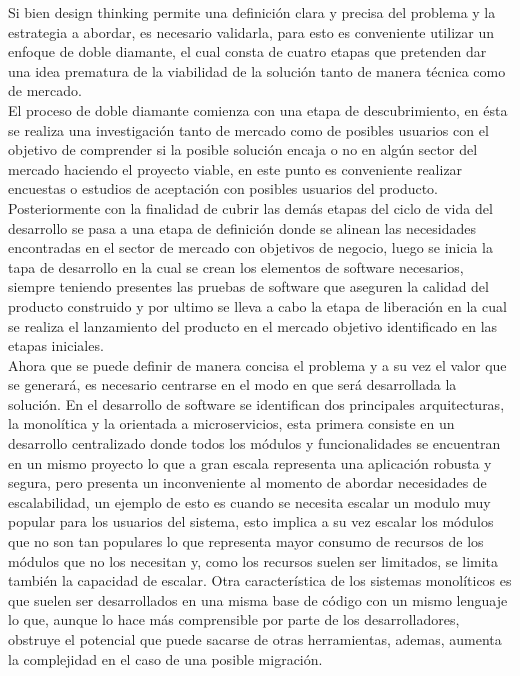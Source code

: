 Si bien design thinking permite una definición clara y precisa del problema y la estrategia a abordar, es necesario validarla, para esto es conveniente utilizar un enfoque de doble diamante, el cual consta de  cuatro etapas que pretenden dar una idea prematura de la viabilidad de la solución tanto de manera técnica como de mercado.\\

El proceso de doble diamante comienza con una etapa de descubrimiento, en ésta se realiza una investigación tanto de mercado como de posibles usuarios con el objetivo de comprender si la posible solución encaja o no en algún sector del mercado haciendo el proyecto viable, en este punto es conveniente realizar encuestas o estudios de aceptación con posibles usuarios del producto. Posteriormente con la finalidad de cubrir las demás etapas del ciclo de vida del desarrollo  se pasa a una etapa de definición donde se alinean las necesidades encontradas en el sector de mercado con objetivos de negocio, luego se inicia la tapa de desarrollo en la cual se crean los elementos de software necesarios, siempre teniendo presentes las pruebas de software que aseguren la calidad del producto construido y por ultimo se lleva a cabo la etapa de liberación en la cual se realiza el lanzamiento del producto en el mercado objetivo identificado en las etapas iniciales.\\

Ahora que se puede definir de manera concisa el problema y a su vez el valor que se generará, es necesario centrarse en el modo en que será desarrollada la solución. En el desarrollo de software se identifican dos principales arquitecturas, la monolítica y la orientada a microservicios, esta primera consiste en un desarrollo centralizado donde todos los módulos y funcionalidades se encuentran en un mismo proyecto lo que a gran escala representa una aplicación robusta y segura, pero presenta un inconveniente al momento de abordar necesidades de escalabilidad, un ejemplo de esto es cuando se necesita escalar un modulo muy popular para los usuarios del sistema, esto implica a su vez escalar los módulos que no son tan populares lo que representa mayor consumo de recursos de los módulos que no los necesitan y, como los recursos suelen ser limitados, se limita también la capacidad de escalar. Otra característica de los sistemas monolíticos es que suelen ser desarrollados en una misma base de código con un mismo lenguaje lo que, aunque lo hace más comprensible por parte de los desarrolladores, obstruye el potencial que puede sacarse de otras herramientas, ademas, aumenta la complejidad en el caso de una posible migración.\\

